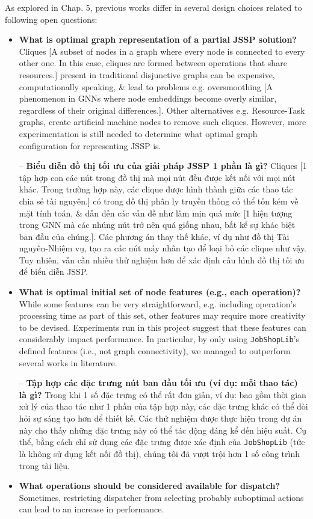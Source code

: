 \documentclass{article}
\begin{document}
\begin{itemize}
\begin{itemize}
        As explored in Chap. 5, previous works differ in several design choices related to following open questions:
        \begin{itemize}
            \item {\bf What is optimal graph representation of a partial JSSP solution?} Cliques [A subset of nodes in a graph where every node is connected to every other one. In this case, cliques are formed between operations that share resources.] present in traditional disjunctive graphs can be expensive, computationally speaking, \& lead to problems e.g. oversmoothing [A phenomenon in GNNs where node embeddings become overly similar, regardless of their original differences.]. Other alternatives e.g. Resource-Task graphs, create artificial machine nodes to remove such cliques. However, more experimentation is still needed to determine what optimal graph configuration for representing JSSP is.

            -- {\bf Biểu diễn đồ thị tối ưu của giải pháp JSSP 1 phần là gì?} Cliques [1 tập hợp con các nút trong đồ thị mà mọi nút đều được kết nối với mọi nút khác. Trong trường hợp này, các clique được hình thành giữa các thao tác chia sẻ tài nguyên.] có trong đồ thị phân ly truyền thống có thể tốn kém về mặt tính toán, \& dẫn đến các vấn đề như làm mịn quá mức [1 hiện tượng trong GNN mà các nhúng nút trở nên quá giống nhau, bất kể sự khác biệt ban đầu của chúng.]. Các phương án thay thế khác, ví dụ như đồ thị Tài nguyên-Nhiệm vụ, tạo ra các nút máy nhân tạo để loại bỏ các clique như vậy. Tuy nhiên, vẫn cần nhiều thử nghiệm hơn để xác định cấu hình đồ thị tối ưu để biểu diễn JSSP.
            \item {\bf What is optimal initial set of node features (e.g., each operation)?} While some features can be very straightforward, e.g. including operation's processing time as part of this set, other features may require more creativity to be devised. Experiments run in this project suggest that these features can considerably impact performance. In particular, by only using {\tt JobShopLib}'s defined features (i.e., not graph connectivity), we managed to outperform several works in literature.

            -- {\bf Tập hợp các đặc trưng nút ban đầu tối ưu (ví dụ: mỗi thao tác) là gì?} Trong khi 1 số đặc trưng có thể rất đơn giản, ví dụ: bao gồm thời gian xử lý của thao tác như 1 phần của tập hợp này, các đặc trưng khác có thể đòi hỏi sự sáng tạo hơn để thiết kế. Các thử nghiệm được thực hiện trong dự án này cho thấy những đặc trưng này có thể tác động đáng kể đến hiệu suất. Cụ thể, bằng cách chỉ sử dụng các đặc trưng được xác định của {\tt JobShopLib} (tức là không sử dụng kết nối đồ thị), chúng tôi đã vượt trội hơn 1 số công trình trong tài liệu.
            \item {\bf What operations should be considered available for dispatch?} Sometimes, restricting dispatcher from selecting probably suboptimal actions can lead to an increase in performance.


\end{itemize}
\end{itemize}
\end{itemize}
\end{document}
